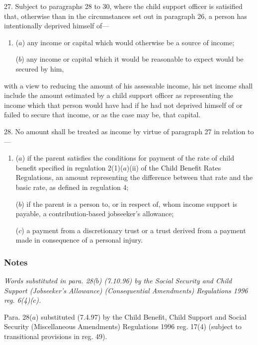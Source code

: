 \documentclass[a4paper]{article}
\newcommand\amendment[1]{\subsubsection*{Notes}{\itshape\frenchspacing\footnotesize #1 \par\goodbreak}}
\begin{document}
\medskip

27.  Subject to paragraphs 28 to 30, where the child support officer is satisified that, otherwise than in the circumstances set out in paragraph 26, a person has intentionally deprived himself of—
\begin{enumerate}\item[]
($a$) any income or capital which would otherwise be a source of income;

($b$) any income or capital which it would be reasonable to expect would be secured by him,
\end{enumerate}
with a view to reducing the amount of his assessable income, his net income shall include the amount estimated by a child support officer as representing the income which that person would have had if he had not deprived himself of or failed to secure that income, or as the case may be, that capital.

\medskip

28.  No amount shall be treated as income by virtue of paragraph 27 in relation to—
\begin{enumerate}\item[]

($a$) if the parent satisfies the conditions for payment of the rate of child benefit specified in regulation 2(1)($a$)(ii) of the Child Benefit Rates Regulations, an amount representing the difference between that rate and the basic rate, as defined in regulation 4;

($b$) if the parent is a person to, or in respect of, whom income support is payable, %
a contribution-based jobseeker’s allowance;  %

($c$) a payment from a discretionary trust or a trust derived from a payment made in consequence of a personal injury.
\end{enumerate}

\amendment{
Words substituted in para. 28($b$) (7.10.96) by the Social Security and Child Support (Jobseeker's Allowance) (Consequential Amendments) Regulations 1996 reg. 6(4)($c$).

Para. 28($a$) substituted (7.4.97) by the Child Benefit, Child Support and Social Security (Miscellaneous Amendments) Regulations 1996 reg. 17(4) (subject to transitional provisions in reg. 49).
}

\medskip
\end{document}
